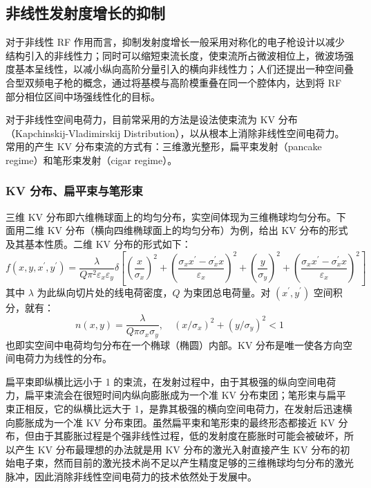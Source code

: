 \subsection{非线性发射度增长的抑制}
对于非线性 RF 作用而言，抑制发射度增长一般采用对称化的电子枪设计以减少结构引入的非线性力；同时可以缩短束流长度，使束流所占微波相位上，微波场强度基本呈线性，以减小纵向高阶分量引入的横向非线性力；人们还提出一种空间叠合型双频电子枪的概念，通过将基模与高阶模重叠在同一个腔体内，达到将 RF 部分相位区间中场强线性化的目标。

对于非线性空间电荷力，目前常采用的方法是设法使束流为 KV 分布（Kapchinskij-Vladimirskij Distribution）\cite{Kapchinskij:1959aa}，以从根本上消除非线性空间电荷力。常用的产生 KV 分布束流的方式有：三维激光整形，扁平束发射（pancake regime）和笔形束发射（cigar regime）。

\subsubsection{KV 分布、扁平束与笔形束}
三维 KV 分布即六维椭球面上的均匀分布，实空间体现为三维椭球均匀分布。下面用二维 KV 分布（横向四维椭球面上的均匀分布）为例，给出 KV 分布的形式及其基本性质。二维 KV 分布的形式如下：
\begin{equation}
f(x, y, x^{\prime}, y^{\prime}) = \frac{\lambda}{Q\pi^2\varepsilon_x\varepsilon_y}\delta\left[\left(\frac{x}{\sigma_x}\right)^2+\left(\frac{\sigma_x x^{\prime}-\sigma_x^{\prime} x}{\varepsilon_x}\right)^2+\left(\frac{y}{\sigma_y}\right)^2+\left(\frac{\sigma_x x^{\prime}-\sigma_x^{\prime} x}{\varepsilon_x}\right)^2\right]
\end{equation}
其中 $\lambda$ 为此纵向切片处的线电荷密度，$Q$ 为束团总电荷量。对 $(x^{\prime}, y^{\prime})$ 空间积分，就有：
\begin{equation}
n(x, y) = \frac{\lambda}{Q\pi\sigma_x\sigma_y},\quad (x/\sigma_x)^2+(y/\sigma_y)^2 < 1
\end{equation}
也即实空间中电荷均匀分布在一个椭球（椭圆）内部。KV 分布是唯一使各方向空间电荷力为线性的分布\cite{Kapchinskij:1959aa}。

扁平束即纵横比远小于 1 的束流，在发射过程中，由于其极强的纵向空间电荷力，扁平束流会在很短时间内纵向膨胀成为一个准 KV 分布束团；笔形束与扁平束正相反，它的纵横比远大于 1，是靠其极强的横向空间电荷力，在发射后迅速横向膨胀成为一个准 KV 分布束团。虽然扁平束和笔形束的最终形态都接近 KV 分布，但由于其膨胀过程是个强非线性过程，低的发射度在膨胀时可能会被破坏，所以产生 KV 分布最理想的办法就是用 KV 分布的激光入射直接产生 KV 分布的初始电子束，然而目前的激光技术尚不足以产生精度足够的三维椭球均匀分布的激光脉冲，因此消除非线性空间电荷力的技术依然处于发展中。

